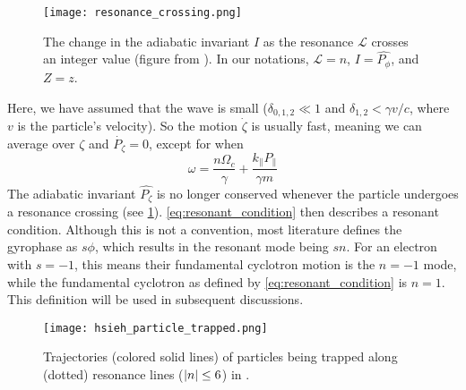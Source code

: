  \begin{figure}
     \centering
     \texttt{[image: resonance\_crossing.png]}
     \caption{The change in the adiabatic invariant $I$ as the resonance
     $\mathcal{L}$ crosses an integer value (figure from \cite{Albert1993}).
 In our notations, $\mathcal{L}=n$, $I=\hat{P_{\phi}}$, and $Z=z$.}
     \label{fig:resonance_crossing}
 \end{figure}
 Here, we have assumed that the wave is small ($\delta_{0,1,2}\ll
 1$ and $\delta_{1,2}<\gamma v/c$, where $v$ is the particle's velocity). So the
 motion $\dot\zeta$ is usually fast, meaning we can average over $\zeta$
 and $\dot{P_\zeta}=0$, except for when
 \begin{equation}\label{eq:resonant_condition}
     \omega=\frac{n\Omega_c}{\gamma}+\frac{k_\|P_\|}{\gamma m}
 \end{equation}
 The adiabatic invariant $\hat{P_\zeta}$ is no longer conserved whenever the particle undergoes a resonance crossing (see \cref{fig:resonance_crossing}). \cref{eq:resonant_condition} then
 describes a resonant condition. Although this is not a convention, most
 literature defines the gyrophase as $s\phi$, which results
 in the resonant mode being $sn$. For an electron with $s=-1$, this means
 their fundamental cyclotron motion is the $n=-1$ mode, while the fundamental
 cyclotron as defined by \cref{eq:resonant_condition} is $n=1$. This definition 
 will be used in subsequent discussions. 

\begin{figure}
     \centering
     \texttt{[image: hsieh\_particle\_trapped.png]}
     \caption{Trajectories (colored solid lines) of particles being trapped
         along (dotted) resonance lines
     ($\abs{n}\leq6$) in \cite{Hsieh2017}.}
     \label{fig:trapped_particles}
 \end{figure}
